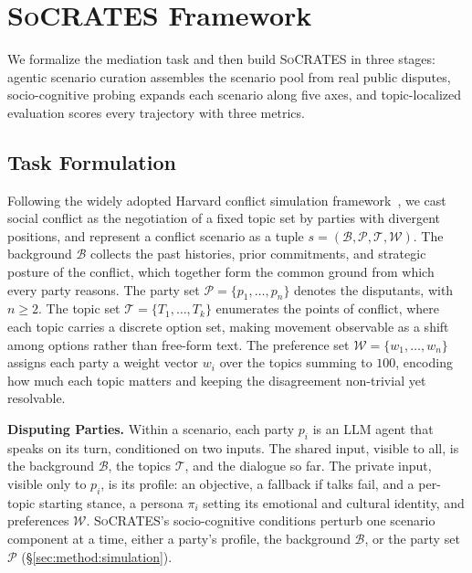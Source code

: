 \documentclass{llmxive}
\providecommand{\algname}{\textsc{SoCRATES}}
\begin{document}
\section{\algname{} Framework}
\label{sec:method}

We formalize the mediation task and then build \algname{} in three stages: agentic scenario curation assembles the scenario pool from real public disputes, socio-cognitive probing expands each scenario along five axes, and topic-localized evaluation scores every trajectory with three metrics.

\subsection{Task Formulation}
\label{sec:method:task}

Following the widely adopted Harvard conflict simulation framework~\citep{fisher2011getting}, we cast social conflict as the negotiation of a fixed topic set by parties with divergent positions, and represent a conflict scenario as a tuple $s = (\mathcal{B}, \mathcal{P}, \mathcal{T}, \mathcal{W})$.
%
The background $\mathcal{B}$ collects the past histories, prior commitments, and strategic posture of the conflict, which together form the common ground from which every party reasons. The party set $\mathcal{P} = \{p_1, \dots, p_n\}$ denotes the disputants, with $n \geq 2$. The topic set $\mathcal{T} = \{T_1, \dots, T_k\}$ enumerates the points of conflict, where each topic carries a discrete option set, making movement observable as a shift among options rather than free-form text. The preference set $\mathcal{W} = \{w_1, \dots, w_n\}$ assigns each party a weight vector $w_i$ over the topics summing to $100$, encoding how much each topic matters and keeping the disagreement non-trivial yet resolvable.

\smallskip\smallskip\noindent\textbf{{Disputing Parties.}}
Within a scenario, each party $p_i$ is an LLM agent that speaks on its turn, conditioned on two inputs. The shared input, visible to all, is the background $\mathcal{B}$, the topics $\mathcal{T}$, and the dialogue so far. The private input, visible only to $p_i$, is its profile: an objective, a fallback if talks fail, and a per-topic starting stance, a persona $\pi_i$ setting its emotional and cultural identity, and preferences $\mathcal{W}$. \algname{}'s socio-cognitive conditions perturb one scenario component at a time, either a party's profile, the background $\mathcal{B}$, or the party set $\mathcal{P}$ (\S\ref{sec:method:simulation}).
\end{document}
